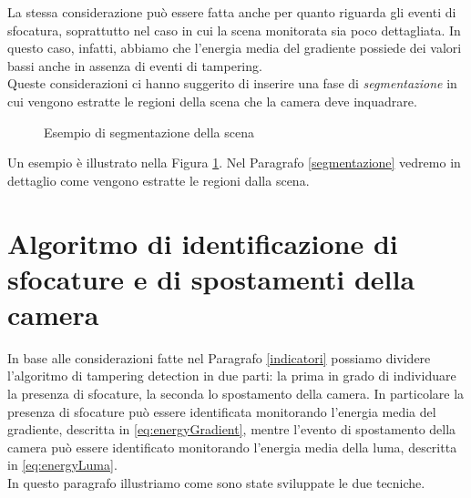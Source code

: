 La stessa considerazione pu\`o essere fatta anche per quanto riguarda gli eventi di sfocatura, soprattutto nel caso in cui la scena monitorata sia poco dettagliata.
In questo caso, infatti, abbiamo che l'energia media del gradiente possiede dei valori bassi anche in assenza di eventi di tampering.\\
Queste considerazioni ci hanno suggerito di inserire una fase di \textit{segmentazione} in cui vengono estratte le regioni della scena che la camera deve inquadrare.
 \begin{figure}[tb]
 	\centering
 	\caption{Esempio di segmentazione della scena}
 	\label{fig:testiSEGMENTAZIONE}
 \end{figure}
Un esempio \`e illustrato nella Figura \ref{fig:testiSEGMENTAZIONE}. 
Nel Paragrafo \ref{segmentazione} vedremo in dettaglio come vengono estratte le regioni dalla scena.
\section{Algoritmo di identificazione di sfocature e di spostamenti della camera}
\label{monitoraggio}
In base alle considerazioni fatte nel Paragrafo \ref{indicatori} possiamo dividere l'algoritmo di tampering detection in due parti:
la prima in grado di individuare la presenza di sfocature, la seconda lo spostamento della camera.
In particolare la presenza di sfocature pu\`o essere identificata monitorando l'energia media del gradiente, descritta in \eqref{eq:energyGradient}, mentre l'evento di spostamento della camera pu\`o essere identificato monitorando l'energia media della luma, descritta in \eqref{eq:energyLuma}.\\
In questo paragrafo illustriamo come sono state sviluppate le due tecniche.
